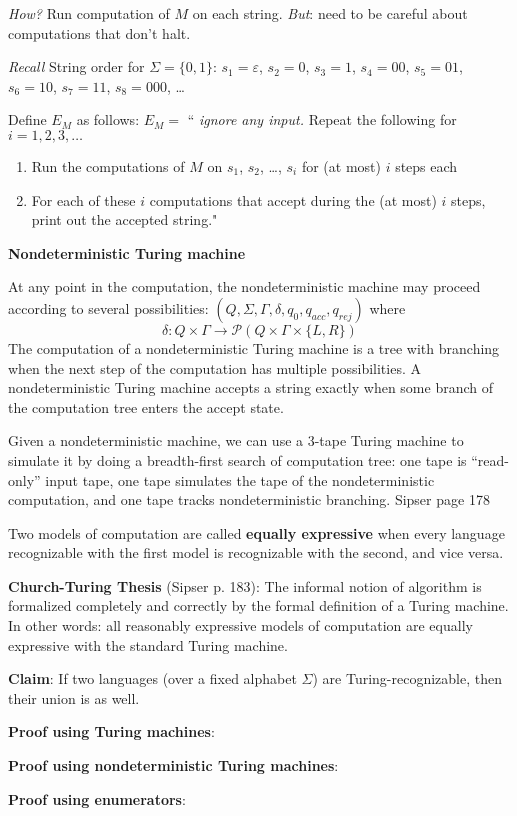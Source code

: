 {\it How?} Run computation of $M$ on each string.  {\it But}: need to be careful 
about computations that don't halt.

{\it Recall} String order for $\Sigma = \{0,1\}$: $s_1 = \varepsilon$, $s_2 = 0$, $s_3 = 1$, $s_4 = 00$, $s_5 = 01$, $s_6  = 10$, 
$s_7  =  11$, $s_8 = 000$, \ldots

Define $E_M$ as follows: $E_{M} = $ `` {\it ignore any input.} Repeat the following for $i=1, 2, 3, \ldots$
\begin{enumerate}
  \item Run the computations of $M$ on $s_1$, $s_2$, \ldots, $s_i$ for (at most) $i$ steps each
  \item For each of these $i$ computations that accept during the (at most) $i$ steps, print
  out the accepted string."
\end{enumerate}

\newpage

{\bf Nondeterministic Turing machine}

At any point in the computation, the nondeterministic machine may proceed according to 
several possibilities: $(Q, \Sigma, \Gamma, \delta, q_0, q_{acc}, q_{rej})$ where 
\[
\delta: Q \times \Gamma \to \mathcal{P}(Q \times \Gamma \times \{L, R\})  
\]
The computation of a nondeterministic Turing machine is a tree with branching
when the next step of the computation has multiple possibilities. A nondeterministic
Turing machine accepts a string exactly when some branch of the computation tree 
enters the accept state.

Given a nondeterministic machine, we can use a $3$-tape Turing machine to 
simulate it by doing a breadth-first search of computation tree: one tape 
is ``read-only'' input tape, one tape simulates the tape of the nondeterministic
computation, and one tape tracks nondeterministic branching. {\tiny Sipser page 178} 

\vfill
Two models of computation are called {\bf equally expressive} when 
every language recognizable with the first model is recognizable with the second, and vice versa.

{\bf  Church-Turing Thesis} (Sipser p. 183): The informal notion of algorithm is formalized completely  and correctly by the 
formal definition of a  Turing machine. In other words: all reasonably expressive models of 
computation are equally expressive with the standard Turing machine.

\vfill

\newpage

{\bf Claim}: If two languages  (over a fixed alphabet  $\Sigma$) are Turing-recognizable, then  their union  is  as well.

{\bf Proof using Turing machines}:

\vfill

{\bf Proof using nondeterministic Turing machines}: 

\vfill  

{\bf  Proof using enumerators}:

\vfill


